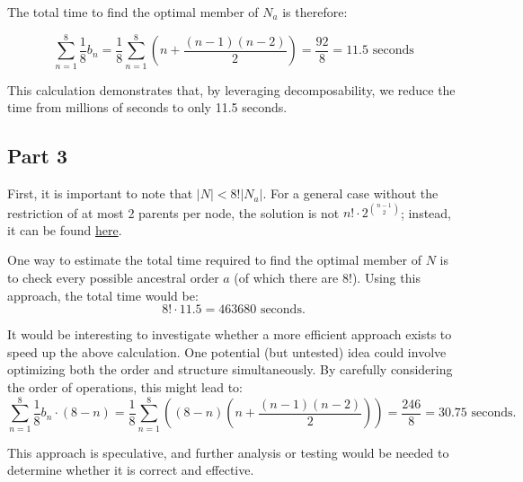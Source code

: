 \documentclass{article}
\begin{document}
The total time to find the optimal member of \( N_a \) is therefore:

\[
\sum_{n=1}^{8} \frac{1}{8} b_n = \frac{1}{8} \sum_{n=1}^{8} \left( n + \frac{(n-1)(n-2)}{2} \right) = \frac{92}{8} = 11.5 \text{ seconds}
\]

This calculation demonstrates that, by leveraging decomposability, we reduce the time from millions of seconds to only 11.5 seconds.

\subsection*{Part 3}

First, it is important to note that \( |N| < 8! |N_a| \). For a general case without the restriction of at most 2 parents per node, the solution is not \( n! \cdot 2^{\binom{n-1}{2}} \); instead, it can be found \href{https://en.wikipedia.org/wiki/Directed_acyclic_graph#Combinatorial_enumeration}{here}.

One way to estimate the total time required to find the optimal member of \( N \) is to check every possible ancestral order \( a \) (of which there are \( 8! \)). Using this approach, the total time would be:
\[
8! \cdot 11.5 = 463680 \text{ seconds.}
\]

It would be interesting to investigate whether a more efficient approach exists to speed up the above calculation. One potential (but untested) idea could involve optimizing both the order and structure simultaneously. By carefully considering the order of operations, this might lead to:
\[
\sum_{n=1}^{8} \frac{1}{8} b_n \cdot (8 - n) = \frac{1}{8} \sum_{n=1}^{8} \left( (8 - n) \left( n + \frac{(n-1)(n-2)}{2} \right) \right) = \frac{246}{8} = 30.75 \text{ seconds.}
\]

This approach is speculative, and further analysis or testing would be needed to determine whether it is correct and effective.
\end{document}
